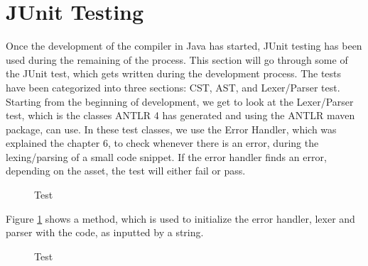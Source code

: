 \section{JUnit Testing}
Once the development of the compiler in Java has started, JUnit testing has been used during the remaining of the process. This section will go through some of the JUnit test, which gets written during the development process. The tests have been categorized into three sections: CST, AST, and Lexer/Parser test. 
Starting from the beginning of development, we get to look at the Lexer/Parser test, which is the classes ANTLR 4 has generated and using the ANTLR maven package, can use. In these test classes, we use the Error Handler, which was explained the chapter 6, to check whenever there is an error, during the lexing/parsing of a small code snippet. If the error handler finds an error, depending on the asset, the test will either fail or pass. 
\begin{figure}[H]
\centering
{}
\caption{Test}
\label{test1}
\end{figure}
Figure \ref{test1} shows a method, which is used to initialize the error handler, lexer and parser with the code, as inputted by a string. 
\begin{figure}[H]
\centering
{}
\caption{Test}
\label{test2}
\end{figure}
